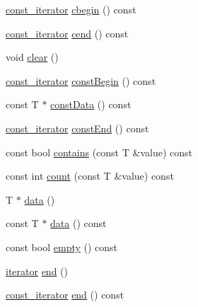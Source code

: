 \begin{DoxyCompactItemize}
\item 
\hyperlink{classprism_1_1containers_1_1_vector_ab972cb3df6df07d9806f8750a948ec9d}{const\+\_\+iterator} \hyperlink{classprism_1_1containers_1_1_vector_ae237687c1dc7aca2868fa1395b6549ea}{cbegin} () const 
\item 
\hyperlink{classprism_1_1containers_1_1_vector_ab972cb3df6df07d9806f8750a948ec9d}{const\+\_\+iterator} \hyperlink{classprism_1_1containers_1_1_vector_a09a061933b3d0946e9c25ad87e6b242a}{cend} () const 
\item 
void \hyperlink{classprism_1_1containers_1_1_vector_abf853c583423758c8ee9ec27fc1c210b}{clear} ()
\item 
\hyperlink{classprism_1_1containers_1_1_vector_ab972cb3df6df07d9806f8750a948ec9d}{const\+\_\+iterator} \hyperlink{classprism_1_1containers_1_1_vector_addbf80b5fc2fad2e4e85beabfd92afd7}{const\+Begin} () const 
\item 
const T $\ast$ \hyperlink{classprism_1_1containers_1_1_vector_a2f38f1c1ea22186590873a799364becf}{const\+Data} () const 
\item 
\hyperlink{classprism_1_1containers_1_1_vector_ab972cb3df6df07d9806f8750a948ec9d}{const\+\_\+iterator} \hyperlink{classprism_1_1containers_1_1_vector_a1cebbe63705c688ec354119dd47b9e6c}{const\+End} () const 
\item 
const bool \hyperlink{classprism_1_1containers_1_1_vector_a80fd2ca147e135b02b11a28f4edc2a0f}{contains} (const T \&value) const 
\item 
const int \hyperlink{classprism_1_1containers_1_1_vector_af6eed18f3336ec579c89d64819e0cb74}{count} (const T \&value) const 
\item 
T $\ast$ \hyperlink{classprism_1_1containers_1_1_vector_acbc6ec2533f7853cf6ce5b8d0cc84d0b}{data} ()
\item 
const T $\ast$ \hyperlink{classprism_1_1containers_1_1_vector_aa46fe53854caefbeae5e29f254c1657d}{data} () const 
\item 
const bool \hyperlink{classprism_1_1containers_1_1_vector_a80e3ca5a538da5e15a4773173c820518}{empty} () const 
\item 
\hyperlink{classprism_1_1containers_1_1_vector_a00f2237bf0922d6299f1004c0a717fd5}{iterator} \hyperlink{classprism_1_1containers_1_1_vector_af70c02efa2acea9da2ea192ba83e6edd}{end} ()
\item 
\hyperlink{classprism_1_1containers_1_1_vector_ab972cb3df6df07d9806f8750a948ec9d}{const\+\_\+iterator} \hyperlink{classprism_1_1containers_1_1_vector_ae2362e0b909620a7aad33bd659ef23a5}{end} () const 

\end{DoxyCompactItemize}
